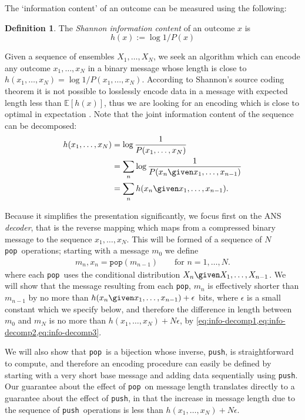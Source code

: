 \documentclass{article}
\theoremstyle{definition}
\newtheorem{definition}{Definition}
\newcommand{\push}{\texttt{push}}
\newcommand{\pop}{\texttt{pop}}
\begin{document}
  The `information content' of an outcome can be measured using the following:
  \begin{definition}
    The \emph{Shannon information content} of an outcome \(x\) is
    \begin{equation}
      h(x) := \log 1 / P(x)
    \end{equation}
  \end{definition}
  Given a sequence of ensembles \(X_1, \ldots, X_N\), we seek an algorithm
  which can encode any outcome \(x_1, \ldots, x_N\) in a binary message whose
  length is close to \(h(x_1, \ldots, x_N) = \log 1/P(x_1, \ldots, x_N)\).
  According to Shannon's source coding theorem it is not possible to losslessly
  encode data in a message with expected length less than \(\mathbb{E}[h(x)]\),
  thus we are looking for an encoding which is close to optimal in expectation
  \citep{shannon1948}. Note that the joint information content of the sequence
  can be decomposed:
  \begin{align}
    \label{eq:info-decomp1}
    h(x_1, \ldots, x_N)
      &= \log\frac{1}{P(x_1, \ldots, x_N)}\\
      \label{eq:info-decomp2}
      &= \sum_n \log\frac{1}{P(x_n \given x_1, \ldots, x_{n-1})}\\
      \label{eq:info-decomp3}
      &= \sum_n h(x_n \given x_1, \ldots, x_{n-1}).
  \end{align}

  Because it simplifies the presentation significantly, we focus first on the
  ANS \emph{decoder}, that is the reverse mapping which maps from a compressed
  binary message to the sequence \(x_1, \ldots, x_N\). This will be formed of a
  sequence of \(N\) \pop\ operations; starting with a message \(m_0\) we define
  \begin{align}
    m_n, x_n = \pop(m_{n-1})\qquad\text{for }n=1, \ldots, N.
  \end{align}
  where each \pop\ uses the conditional distribution \(X_n\given X_1, \ldots,
  X_{n-1}\). We will show that the message resulting from each \pop, \(m_n\) is
  effectively shorter than \(m_{n-1}\) by no more than \(h(x_n \given x_1,
  \ldots, x_{n-1}) + \epsilon\) bits, where \(\epsilon\) is a small constant
  which we specify below, and therefore the difference in length between
  \(m_0\) and \(m_N\) is no more than \(h(x_1, \ldots, x_N) + N\epsilon\), by
  \cref{eq:info-decomp1,eq:info-decomp2,eq:info-decomp3}.

  We will also show that \pop\ is a bijection whose inverse, \push, is
  straightforward to compute, and therefore an encoding procedure can easily be
  defined by starting with a very short base message and adding data
  sequentially using \push. Our guarantee about the effect of \pop\ on message
  length translates directly to a guarantee about the effect of \push, in that
  the increase in message length due to the sequence of \push\ operations is
  less than \(h(x_1, \ldots, x_N) + N\epsilon\).
\end{document}
